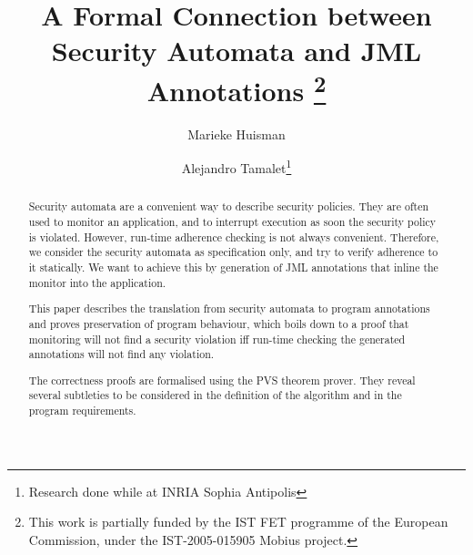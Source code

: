\documentclass[]{llncs}
\title{A Formal Connection between Security Automata and JML Annotations
\thanks{This work is partially funded by the IST FET
programme of the European Commission, under the IST-2005-015905
\textsf{Mobius} project.}}
\author{Marieke Huisman\inst{1} \and Alejandro Tamalet\inst{2}\thanks{Research done while at INRIA Sophia Antipolis}}
\institute{INRIA Sophia Antipolis, France \and
University of Nijmegen, Netherlands}
\begin{document}
\maketitle
\begin{abstract}
Security automata are a convenient way to describe security
policies. They are often used to monitor an application, and to
interrupt execution as soon the security policy is violated. However,
run-time adherence checking is not always convenient.
Therefore, we consider the security automata as specification only,
and try to verify adherence to it statically. We want to achieve this by
generation of JML annotations that inline the monitor into the application.

%
This paper describes the translation from security automata to program
annotations and proves preservation of program behaviour, which
boils down to a proof
that monitoring will not find a security violation iff run-time
checking the generated annotations will not find any violation.

%
%
The correctness proofs are formalised using the PVS theorem prover.
They reveal several subtleties to be considered in the definition of the
algorithm and in the program requirements.
\end{abstract}











\end{document}
